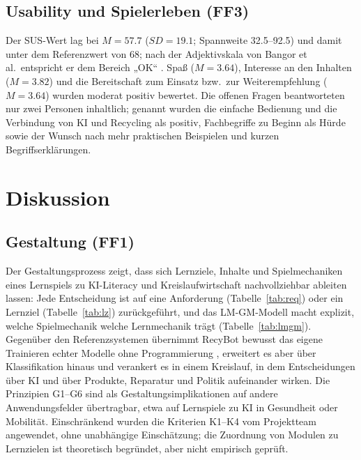 \documentclass[sigconf,nonacm]{acmart}
\begin{document}
\subsection{Usability und Spielerleben (FF3)}
Der SUS-Wert lag bei $M = 57.7$ ($SD = 19.1$; Spannweite 32.5--92.5) und damit unter dem Referenzwert von 68; nach der Adjektivskala von Bangor et al.\ entspricht er dem Bereich „OK“ \cite{bangor2009}. Spaß ($M = 3.64$), Interesse an den Inhalten ($M = 3.82$) und die Bereitschaft zum Einsatz bzw.\ zur Weiterempfehlung ($M = 3.64$) wurden moderat positiv bewertet. Die offenen Fragen beantworteten nur zwei Personen inhaltlich; genannt wurden die einfache Bedienung und die Verbindung von KI und Recycling als positiv, Fachbegriffe zu Beginn als Hürde sowie der Wunsch nach mehr praktischen Beispielen und kurzen Begriffserklärungen.

\section{Diskussion}
\label{sec:discussion}
\subsection{Gestaltung (FF1)}
Der Gestaltungsprozess zeigt, dass sich Lernziele, Inhalte und Spielmechaniken eines Lernspiels zu KI-Literacy und Kreislaufwirtschaft nachvollziehbar ableiten lassen: Jede Entscheidung ist auf eine Anforderung (Tabelle~\ref{tab:req}) oder ein Lernziel (Tabelle~\ref{tab:lz}) zurückgeführt, und das LM-GM-Modell macht explizit, welche Spielmechanik welche Lernmechanik trägt (Tabelle~\ref{tab:lmgm}). Gegenüber den Referenzsystemen übernimmt RecyBot bewusst das eigene Trainieren echter Modelle ohne Programmierung \cite{carney2020,codeorg2019}, erweitert es aber über Klassifikation hinaus und verankert es in einem Kreislauf, in dem Entscheidungen über KI und über Produkte, Reparatur und Politik aufeinander wirken. Die Prinzipien G1--G6 sind als Gestaltungsimplikationen auf andere Anwendungsfelder übertragbar, etwa auf Lernspiele zu KI in Gesundheit oder Mobilität. Einschränkend wurden die Kriterien K1--K4 vom Projektteam angewendet, ohne unabhängige Einschätzung; die Zuordnung von Modulen zu Lernzielen ist theoretisch begründet, aber nicht empirisch geprüft.
\end{document}
